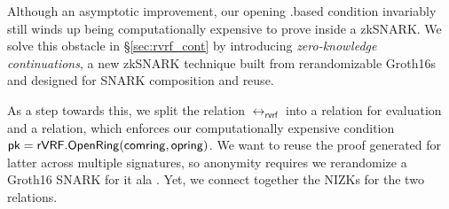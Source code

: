 


Although an asymptotic improvement, our opening \rVRF.\OpenRing based condition invariably
still winds up being computationally expensive to prove inside a zkSNARK.
We solve this obstacle in \S\ref{sec:rvrf_cont}  by introducing
{\em zero-knowledge continuations}, a new zkSNARK technique built from
rerandomizable Groth16s \cite{Groth16} and designed for SNARK composition and reuse.

As a step towards this, we split the relation $ \rel_{\mathsf{rvrf}} $ into a relation
for \rVRF evaluation and a relation, which enforces our
computationally expensive condition $\mathsf{pk} = {\mathsf{rVRF}}.{\mathsf{OpenRing}}(\mathsf{comring},\mathsf{opring})$.
We want to reuse the proof generated for latter across multiple \rVRF signatures, so anonymity
requires we rerandomize a Groth16 SNARK for it
ala \cite[Theorem 3, Appendix C, pp. 31]{RandomizationGroth16}.
%
Yet, we connect together the NIZKs for the two relations.

%


%

